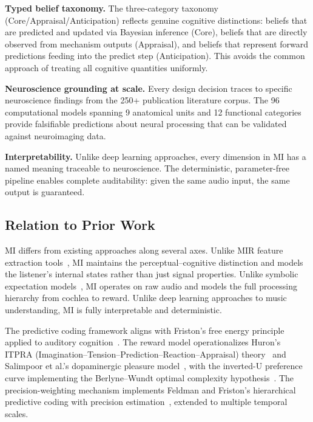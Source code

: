 \documentclass[10pt,twocolumn]{article}
\begin{document}
\textbf{Typed belief taxonomy.}
The three-category taxonomy (Core/Appraisal/Anticipation) reflects genuine cognitive distinctions: beliefs that are predicted and updated via Bayesian inference (Core), beliefs that are directly observed from mechanism outputs (Appraisal), and beliefs that represent forward predictions feeding into the predict step (Anticipation).
This avoids the common approach of treating all cognitive quantities uniformly.

\textbf{Neuroscience grounding at scale.}
Every design decision traces to specific neuroscience findings from the 250+ publication literature corpus.
The 96 computational models spanning 9 anatomical units and 12 functional categories provide falsifiable predictions about neural processing that can be validated against neuroimaging data.

\textbf{Interpretability.}
Unlike deep learning approaches, every dimension in MI has a named meaning traceable to neuroscience.
The deterministic, parameter-free pipeline enables complete auditability: given the same audio input, the same output is guaranteed.

\subsection{Relation to Prior Work}

MI differs from existing approaches along several axes.
Unlike MIR feature extraction tools~\cite{mcfee2015librosa,mueller2015fundamentals}, MI maintains the perceptual--cognitive distinction and models the listener's internal states rather than just signal properties.
Unlike symbolic expectation models~\cite{pearce2018idyom}, MI operates on raw audio and models the full processing hierarchy from cochlea to reward.
Unlike deep learning approaches to music understanding, MI is fully interpretable and deterministic.

The predictive coding framework aligns with Friston's free energy principle~\cite{friston2010} applied to auditory cognition~\cite{koelsch2019}.
The reward model operationalizes Huron's ITPRA (Imagination--Tension--Prediction--Reaction--Appraisal) theory~\cite{huron2006} and Salimpoor et al.'s dopaminergic pleasure model~\cite{salimpoor2011}, with the inverted-U preference curve implementing the Berlyne--Wundt optimal complexity hypothesis~\cite{berlyne1971}.
The precision-weighting mechanism implements Feldman and Friston's hierarchical predictive coding with precision estimation~\cite{friston2010}, extended to multiple temporal scales.
\end{document}
